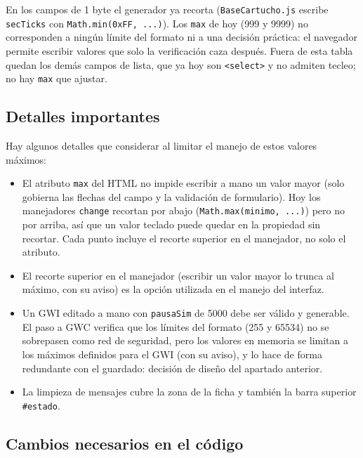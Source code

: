 En los campos de 1 byte el generador ya recorta (\texttt{BaseCartucho.js} escribe \texttt{secTicks} con \texttt{Math.min(0xFF, ...)}). Los \texttt{max} de hoy (999 y 9999) no corresponden a ningún límite del formato ni a una decisión práctica: el navegador permite escribir valores que solo la verificación caza después. Fuera de esta tabla quedan los demás campos de lista, que ya hoy son \texttt{<select>} y no admiten tecleo; no hay \texttt{max} que ajustar.

\subsection{Detalles importantes}
\label{sec:F5I16Detalles}

Hay algunos detalles que considerar al limitar el manejo de estos valores máximos:

\begin{itemize}
	\item El atributo \texttt{max} del HTML no impide escribir a mano un valor mayor (solo gobierna las flechas del campo y la validación de formulario). Hoy los manejadores \texttt{change} recortan por abajo (\texttt{Math.max(minimo, ...)}) pero no por arriba, así que un valor teclado puede quedar en la propiedad sin recortar. Cada punto incluye el recorte superior en el manejador, no solo el atributo.
	\item El recorte superior en el manejador (escribir un valor mayor lo trunca al máximo, con su aviso) es la opción utilizada en el manejo del interfaz.
	\item Un GWI editado a mano con \texttt{pausaSim} de 5000 debe ser válido y generable. El paso a GWC verifica que los límites del formato (255 y 65534) no se sobrepasen como red de seguridad, pero los valores en memoria se limitan a los máximos definidos para el GWI (con su aviso), y lo hace de forma redundante con el guardado: decisión de diseño del apartado anterior.
	\item La limpieza de mensajes cubre la zona de la ficha y también la barra superior \texttt{\#estado}.
\end{itemize}

\subsection{Cambios necesarios en el código}
\label{sec:F5I16Codigo}

